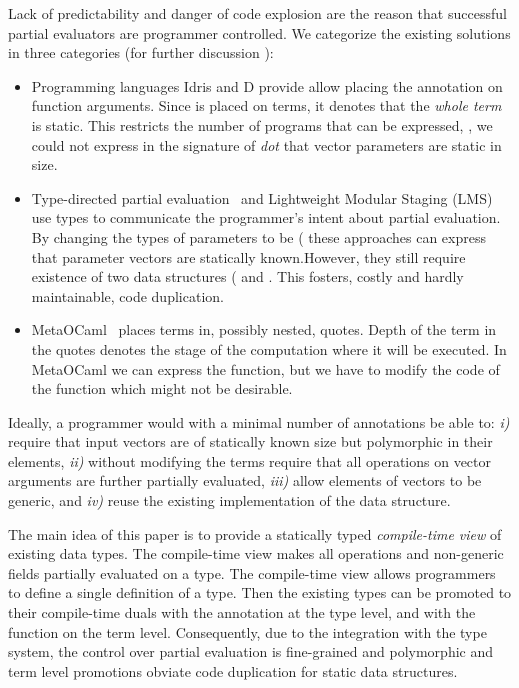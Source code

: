 Lack of predictability and danger of code explosion are the reason that
 successful partial evaluators
 \cite{brady2010,taha_multi-stage_1997,rompf2012lightweight,wurthinger2013one,le2004specialization}
  are programmer controlled. We categorize the existing solutions in three categories
 (for further discussion \cf {}):

\begin{itemize}
 \item Programming languages Idris and D provide allow placing the 
  annotation on function arguments. Since  is placed on terms, it
  denotes that the \emph{whole term} is static. This restricts the number of programs
  that can be expressed, \eg, we could not express in the signature of \emph{dot} that
  vector parameters are static in size.

 \item Type-directed partial evaluation~\cite{danvy1999type} and
  Lightweight Modular Staging (LMS)~\cite{rompf2012lightweight} use types to communicate
  the programmer's intent about partial evaluation. By changing the types of parameters
  to be (\eg {} these approaches can express that parameter vectors
  are statically known.However, they still require existence of two data structures
  (\eg {} and . This fosters, costly and hardly maintainable, code duplication.

 \item MetaOCaml~\cite{taha_multi-stage_1997} places terms in, possibly nested,
   quotes. Depth of the term in the quotes denotes the stage of the computation
   where it will be executed. In MetaOCaml we can express the  function,
   but we have to modify the code of the  function which might not be desirable.

\end{itemize}



Ideally, a programmer would with a minimal number of annotations be able to:
 \emph{i)} require that input vectors are of statically known size but polymorphic
  in their elements, \emph{ii)} without modifying the terms require that all operations
  on vector arguments are further partially evaluated, \emph{iii)} allow elements
  of vectors to be generic, and \emph{iv)} reuse the existing implementation of
  the  data structure.

The main idea of this paper is to provide a statically typed \emph{compile-time
 view} of existing data types. The compile-time view makes all operations and
 non-generic fields partially evaluated on a type. The compile-time view allows
 programmers to define a single definition of a type. Then the existing types
 can be promoted to their compile-time duals with the  annotation at
 the type level, and with the  function on the term level.
 Consequently, due to the integration with the type system, the control over
 partial evaluation is fine-grained and polymorphic and term level promotions
 obviate code duplication for static data structures.


